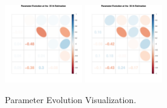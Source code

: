 \begin{figure}[h]
\includegraphics[width=0.3\textwidth,height=0.2\textheight]{Chapters/05MCMCOU/plots/paraEvolution/corMatrix35.pdf}
\includegraphics[width=0.3\textwidth,height=0.2\textheight]{Chapters/05MCMCOU/plots/paraEvolution/corMatrix36.pdf}
\caption{Parameter Evolution Visualization. }
\end{figure}

\clearpage

